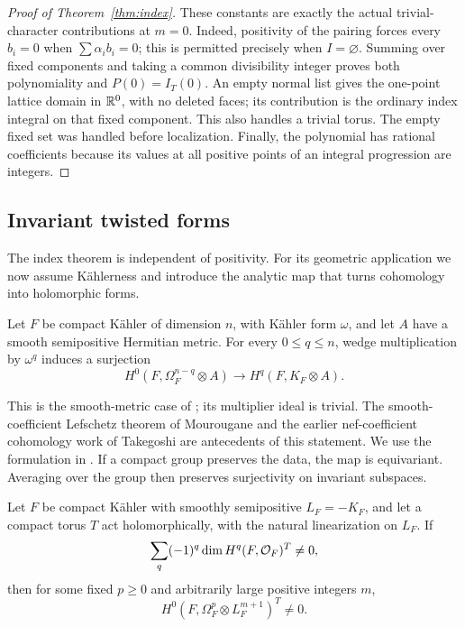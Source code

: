 \begin{proof}[Proof of Theorem~\ref{thm:index}]
These constants are exactly the actual trivial-character contributions
at \(m=0\). Indeed, positivity of the pairing forces every \(b_i=0\)
when \(\sum\alpha_i b_i=0\); this is permitted precisely when
\(I=\varnothing\). Summing over fixed components and taking a common
divisibility integer proves both polynomiality and \(P(0)=I_T(0)\).
An empty normal list gives the one-point lattice domain in \(\mathbb R^0\),
with no deleted faces; its contribution is the ordinary index integral
on that fixed component. This also handles a trivial torus. The empty
fixed set was handled before localization.
Finally, the polynomial has rational coefficients because its values at
all positive points of an integral progression are integers.
\end{proof}

\subsection{Invariant twisted forms}

The index theorem is independent of positivity. For its geometric
application we now assume K\"ahlerness and introduce the analytic map
that turns cohomology into holomorphic forms.

\begin{theorem}
\label{thm:lef}
Let \(F\) be compact Kähler of dimension \(n\), with Kähler form
\(\omega\), and let \(A\) have a smooth semipositive Hermitian metric.
For every \(0\le q\le n\), wedge multiplication by \(\omega^q\) induces a
surjection
\[
H^0(F,\Omega_F^{n-q}\otimes A)
\longrightarrow H^q(F,K_F\otimes A).
\]
\end{theorem}

This is the smooth-metric case of
\cite[Theorem~0.1]{DPS2001}; its multiplier ideal is trivial.
The smooth-coefficient Lefschetz theorem of Mourougane
\cite[Theorem~2.6]{Mourougane1999} and the earlier nef-coefficient
cohomology work of Takegoshi \cite[Theorem~1]{Takegoshi1997} are
antecedents of this statement. We use the formulation in \cite{DPS2001}.
If a compact group preserves the data, the map is equivariant. Averaging
over the group then preserves surjectivity on invariant subspaces.

\begin{corollary}\label{cor:invariantforms}
Let \(F\) be compact Kähler with smoothly semipositive
\(L_F=-K_F\), and let a compact torus \(T\) act holomorphically,
with the natural linearization on \(L_F\). If
\[
\sum_q(-1)^q\dim H^q(F,\mathcal O_F)^T\ne0,
\]
then for some fixed \(p\ge0\) and arbitrarily large positive integers
\(m\),
\[
H^0(F,\Omega_F^p\otimes L_F^{m+1})^T\ne0.
\]
\end{corollary}

